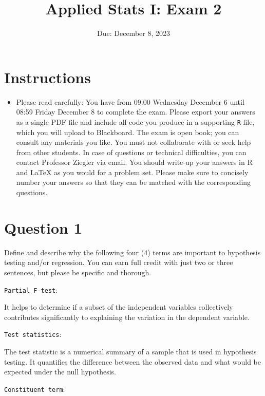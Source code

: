 \documentclass[12pt,letterpaper]{article}
\title{Applied Stats I: Exam 2}
\date{Due: December 8, 2023}
\begin{document}
	\maketitle
	\section*{Instructions}
	\begin{itemize}
		\item Please read carefully: You have from 09:00 Wednesday December 6 until 08:59
		Friday December 8 to complete the exam. Please export your answers as a single
		PDF file and include all code you produce in a supporting \texttt{R} file, which you will
		upload to Blackboard. The exam is open book; you can consult any materials you
		like. You must not collaborate with or seek help from other students. In case
		of questions or technical difficulties, you can contact Professor Ziegler via email. You
		should write-up your answers in R and LaTeX as you would for a problem set. Please
		make sure to concisely number your answers so that they can be matched with the
		corresponding questions.
	\end{itemize}


	\vspace{.5cm}
\section*{Question 1}
\vspace{.25cm}
\noindent 	

Define and describe why the following four (4) terms are important to hypothesis testing
and/or regression. You can earn full credit with just two or three sentences, but please be
specific and thorough.

\vspace{.25cm}

\noindent 

\texttt{Partial F-test}: 

It helps to determine if a subset of the independent variables collectively contributes significantly to explaining the variation in the dependent variable. 

\texttt{Test statistics}: 

The test statistic is a numerical summary of a sample that is used in hypothesis testing. It quantifies the difference between the observed data and what would be expected under the null hypothesis. 

\texttt{Constituent term}: 
\end{document}

